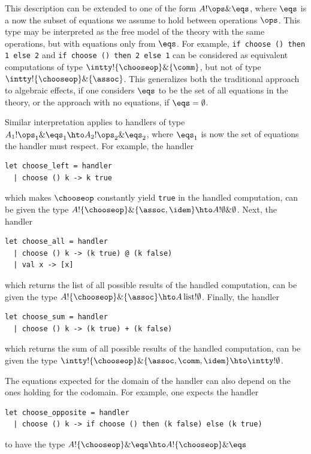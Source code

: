 \documentclass[a4paper,UKenglish]{dagrep}
\begin{document}
This description can be extended to one of the form $A ! \ops \& \eqs$, where $\eqs$ is a now the subset of equations we assume to hold between operations $\ops$. This type may be interpreted as the free model of the theory with the same operations, but with equations only from $\eqs$. For example, \verb|if choose () then 1 else 2| and \verb|if choose () then 2 else 1| can be considered as equivalent computations of type $\intty ! \{ \chooseop \} \& \{ \comm \}$, but not of type $\intty ! \{ \chooseop \} \& \{ \assoc \}$. This generalizes both the traditional approach to algebraic effects, if one considers $\eqs$ to be the set of all equations in the theory, or the approach with no equations, if $\eqs = \emptyset$.

Similar interpretation applies to handlers of type $A_1 ! \ops_1 \& \eqs_1 \hto A_2 ! \ops_2 \& \eqs_2$, where $\eqs_1$ is now the set of equations the handler must respect. For example, the handler
%
\begin{verbatim}
let choose_left = handler
  | choose () k -> k true
\end{verbatim}
%
which makes $\chooseop$ constantly yield \verb|true| in the handled computation,
can be given the type $A ! \{ \chooseop \} \& \{ \assoc, \idem \} \hto A ! \emptyset \& \emptyset$.
Next, the handler
%
\begin{verbatim}
let choose_all = handler
  | choose () k -> (k true) @ (k false)
  | val x -> [x]
\end{verbatim}
%
which returns the list of all possible results of the handled computation,
can be given the type $A ! \{ \chooseop \} \& \{ \assoc \} \hto A \, \mathrm{list} ! \emptyset$.
Finally, the handler
%
\begin{verbatim}
let choose_sum = handler
  | choose () k -> (k true) + (k false)
\end{verbatim}
%
which returns the sum of all possible results of the handled computation,
can be given the type $\intty ! \{ \chooseop \} \& \{ \assoc, \comm, \idem \} \hto \intty ! \emptyset$.

The equations expected for the domain of the handler can also depend on the ones
holding for the codomain. For example, one expects the handler
%
\begin{verbatim}
let choose_opposite = handler
  | choose () k -> if choose () then (k false) else (k true)
\end{verbatim}
%
to have the type \quad $A ! \{ \chooseop \} \& \eqs \hto A ! \{ \chooseop \} \& \eqs$
\end{document}
